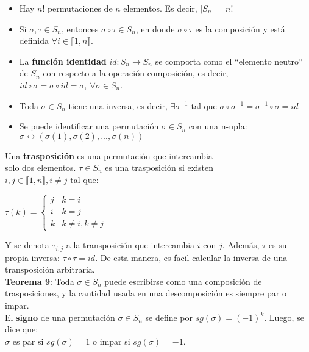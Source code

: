 \documentclass[11pt,a4paper]{article}
\begin{document}
\begin{itemize}
\itemsep-0.3em
\item Hay $n!$ permutaciones de $n$ elementos. Es decir, $|S_n| = n!$
\item Si $\sigma, \tau \in S_n$, entonces $\sigma \circ \tau \in S_n$, en donde $\sigma \circ \tau$ es la composici\'on y est\'a definida $\forall i \in \llbracket 1,n \rrbracket$.
\item La \textbf{funci\'on identidad} $id : S_n \rightarrow S_n$ se comporta como el ``elemento neutro'' de $S_n$ con respecto a la operaci\'on composici\'on, es decir, $id \circ \sigma = \sigma \circ id = \sigma,\ \forall \sigma \in S_n$.
\item Toda $\sigma \in S_n$ tiene una inversa, es decir, $\exists \sigma^{-1}$ tal que $\sigma \circ \sigma^{-1} = \sigma^{-1} \circ \sigma = id$
\item Se puede identificar una permutaci\'on $\sigma \in S_n$ con una n-upla: $\sigma \longleftrightarrow (\sigma(1), \sigma(2),...,\sigma(n))$
\end{itemize}
 
\begin{minipage}[c]{0.6\linewidth}
Una \textbf{trasposici\'on} es una permutaci\'on que intercambia\\ solo dos elementos. $\tau \in S_n$ es una trasposici\'on si existen \\ $i, j \in \llbracket 1,n \rrbracket, i \not = j$ tal que:
\end{minipage}
\begin{minipage}[c]{0.3\linewidth}
$\tau(k) = \left\{ \begin{array}{ll} j & k = i \\ i & k = j \\ k & k \not = i, k \not = j\end{array} \right.$
\end{minipage}

Y se denota $\tau_{i,j}$ a la transposici\'on que intercambia $i$ con $j$. Adem\'as, $\tau$ es su propia inversa: $\tau \circ \tau = id$. De esta manera, es facil calcular la inversa de una transposici\'on arbitraria.\\

\textbf{Teorema 9}: Toda $\sigma \in S_n$ puede escribirse como una composici\'on de trasposiciones, y la cantidad usada en una descomposici\'on es siempre par o impar.\\

El \textbf{signo} de una permutaci\'on $\sigma \in S_n$ se define por $sg(\sigma) = (-1)^k$. Luego, se dice que:\\ $\sigma$ es par si $sg(\sigma) = 1$ o impar si $sg(\sigma) = -1$.\\
\end{document}
